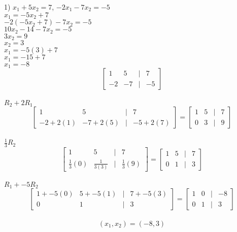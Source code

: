 \documentclass[]{article}
\begin{document}
1) $x_1 + 5x_2 = 7$, $-2x_1 - 7x_2 = -5$\\
$x_1 = -5x_2 + 7$\\
$-2(-5x_2 + 7) - 7x_2 = -5$\\
$10x_2 - 14 - 7x_2 = -5$\\
$3x_2 = 9$\\
$x_2 = 3$\\
$x_1 = -5(3) + 7$\\
$x_1 = -15 + 7$\\
$x_1 = -8$\\
\[
\begin{bmatrix}
	1 & 5 & | & 7 \\
	-2 & -7& | & -5
\end{bmatrix}
\]\\
$R_2 + 2R_1$\\
\[
\begin{bmatrix}
	1 & 5 & | & 7 \\
	-2+2(1) & -7+2(5) & | & -5+2(7)
\end{bmatrix}=
\begin{bmatrix}
	1 & 5 & | & 7 \\
	0 & 3 & | & 9
\end{bmatrix}
\]\\
$\frac{1}{3}R_2$\\
\[
\begin{bmatrix}
	1 & 5 & | & 7 \\
	\frac{1}{3}(0) & \frac{1}{3(3)} & | & \frac{1}{3}(9)
\end{bmatrix}=
\begin{bmatrix}
	1 & 5 & | & 7 \\
	0 & 1 & | & 3
\end{bmatrix}
\]\\
$R_1 + -5R_2$\\
\[
\begin{bmatrix}
	1 + -5(0) & 5 + -5(1) & | & 7 + -5(3) \\
	0 & 1 & | & 3
\end{bmatrix}=
\begin{bmatrix}
	1 & 0 & | & -8 \\
	0 & 1 & | & 3
\end{bmatrix}
\]\\
$$(x_1,x_2) = (-8,3)$$\\
\end{document}
